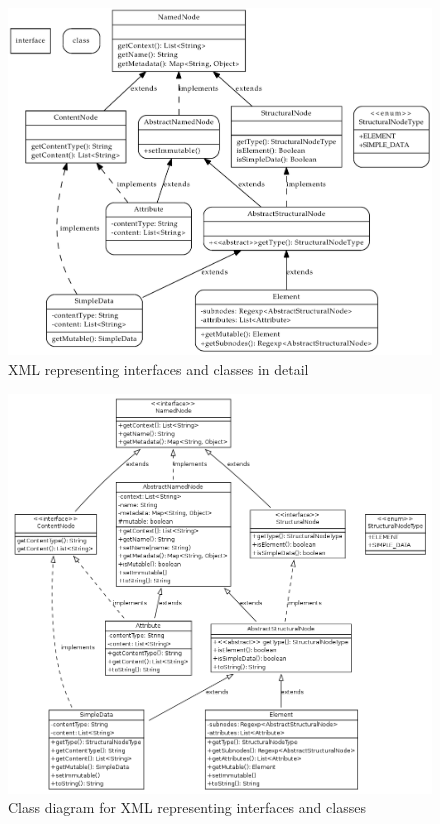 \documentclass[a4paper,10pt,oneside]{article}
\newcommand{\myscale}{0.74}
\begin{document}
\begin{figure}
\centering\includegraphics[scale=\myscale]{nodes_full}
\caption{XML representing interfaces and classes in detail} \label{nodes_full}
\end{figure}
\begin{figure}
\centering\includegraphics[scale=\myscale]{nodes_full2}
\caption{Class diagram for XML representing interfaces and classes} \label{nodes_full2}
\end{figure}
\end{document}
